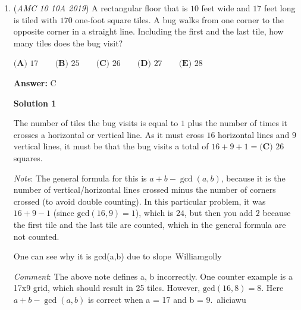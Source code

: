 \begin{enumerate}
 So we move on to the next one, answer choice $B$.

 $\frac{996(996+1)}{2}$ is the sum, and $996!$ is the products. This makes it $996! = 498 \cdot 997 \cdot \mathbb{N}$. But then we can see that 997 is a prime number. In the expression $996!$, there is no 997 as a factor (since $996!$ is $1 \cdot 2 \cdot 3 \cdot \cdots \cdot 995 \cdot 996$, and there is clearly no 997 as a factor), making it so there is no natural number $\mathbb{N}$ that satisfies the equation. So, we can conclude the answer is $\boxed{\textbf{(B) } 996}$

 -Reddessiner (CCG2)

 Education, the Study of Everything

 


	\item (\textit{AMC 10 10A 2019}) A rectangular floor that is $10$ feet wide and $17$ feet long is tiled with $170$ one-foot square tiles. A bug walks from one corner to the opposite corner in a straight line. Including the first and the last tile, how many tiles does the bug visit?


 $\textbf{(A) } 17 \qquad\textbf{(B) } 25 \qquad\textbf{(C) } 26 \qquad\textbf{(D) } 27 \qquad\textbf{(E) } 28$

 \textbf{Answer: }C



\textbf{Solution 1}

The number of tiles the bug visits is equal to $1$ plus the number of times it crosses a horizontal or vertical line.  As it must cross $16$ horizontal lines and $9$ vertical lines, it must be that the bug visits a total of $16+9+1 = \boxed{\textbf{(C) }26}$ squares.

 \textit{Note}: The general formula for this is $a+b-\gcd(a,b)$, because it is the number of vertical/horizontal lines crossed minus the number of corners crossed (to avoid double counting). In this particular problem, it was $16 + 9 - 1$ (since $\text{gcd}(16,9) = 1$), which is $24$, but then you add $2$ because the first tile and the last tile are counted, which in the general formula are not counted.

 One can see why it is gcd(a,b) due to slope~Williamgolly

 \textit{Comment}: The above note defines a, b incorrectly. One counter example is a 17x9 grid, which should result in 25 tiles. However, $\text{gcd}(16, 8) = 8$. Here $a+b-\gcd(a,b)$ is correct when a = 17 and b = 9.~aliciawu


\end{enumerate}
